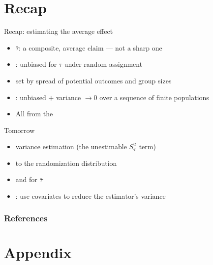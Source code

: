 \documentclass[table, xcolor = {dvipsnames}, 9pt]{beamer}
\theoremstyle{plain}
\newcommand{\mh}[1]{{\color{magenta}{#1}}}
\begin{document}
\section{Recap}

\begin{frame}[t]{Recap: estimating the average effect}
\vfill
\begin{itemize} \vfill
\item \mh{ATE} $\bar{\tau}$: a composite, average claim --- not a sharp one \vfill
\item \mh{Difference-in-means}: unbiased for $\bar{\tau}$ under random assignment \vfill
\item \mh{Variance} set by spread of potential outcomes and group sizes \vfill
\item \mh{Consistent}: unbiased $+$ variance $\to 0$ over a sequence of finite populations \vfill
\item All from the \mh{assignment mechanism} \vfill
\end{itemize} \vfill
\end{frame}
\begin{frame}[t]{Tomorrow}
\vfill
\begin{itemize} \vfill
\item \mh{Conservative} variance estimation (the unestimable $S^2_{\bm{\tau}}$ term) \vfill
\item \mh{Normal approximation} to the randomization distribution \vfill
\item \mh{$p$-values} and \mh{confidence intervals} for $\bar{\tau}$ \vfill
\item \mh{Covariance adjustment}: use covariates to reduce the estimator's variance \vfill
\end{itemize} \vfill
\end{frame}

\begin{frame}[allowframebreaks]
\frametitle{References}
\scriptsize


\end{frame}
\section{Appendix}
\end{document}
